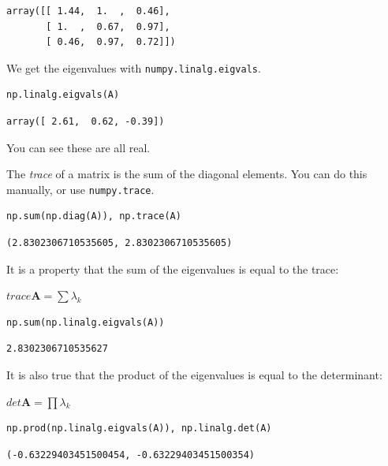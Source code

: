 \documentclass[11pt]{article}
\begin{document}
\begin{verbatim}
array([[ 1.44,  1.  ,  0.46],
       [ 1.  ,  0.67,  0.97],
       [ 0.46,  0.97,  0.72]])
\end{verbatim}

We get the eigenvalues with \texttt{numpy.linalg.eigvals}.

\begin{verbatim}
np.linalg.eigvals(A)
\end{verbatim}

\begin{verbatim}
array([ 2.61,  0.62, -0.39])
\end{verbatim}

You can see these are all real.

The \emph{trace} of a matrix is the sum of the diagonal elements. You can do this manually, or use \texttt{numpy.trace}.

\begin{verbatim}
np.sum(np.diag(A)), np.trace(A)
\end{verbatim}

\begin{verbatim}
(2.8302306710535605, 2.8302306710535605)
\end{verbatim}

It is a property that the sum of the eigenvalues is equal to the trace:

\(trace \mathbf{A} = \sum \lambda_k\)

\begin{verbatim}
np.sum(np.linalg.eigvals(A))
\end{verbatim}

\begin{verbatim}
2.8302306710535627
\end{verbatim}

It is also true that the product of the eigenvalues is equal to the determinant:

\(det \mathbf{A} = \prod \lambda_k\)

\begin{verbatim}
np.prod(np.linalg.eigvals(A)), np.linalg.det(A)
\end{verbatim}

\begin{verbatim}
(-0.63229403451500454, -0.63229403451500354)
\end{verbatim}
\end{document}
